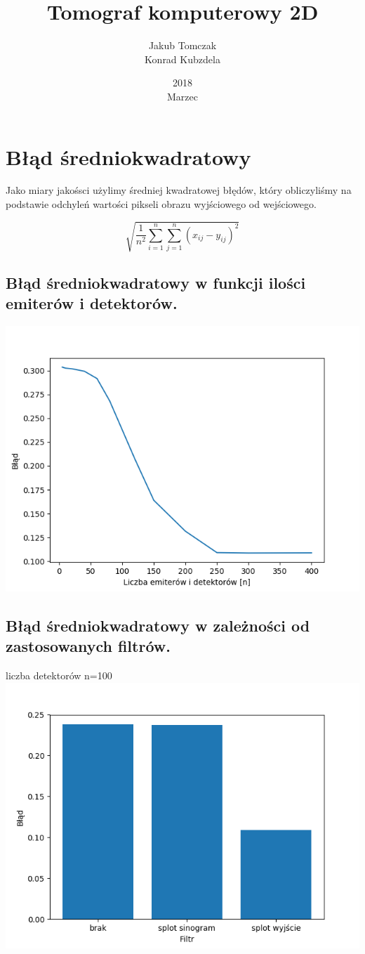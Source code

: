 \documentclass{article}
\title{Tomograf komputerowy 2D}
\date{2018\\ Marzec}
\author{Jakub Tomczak \\ Konrad Kubzdela}
\begin{document}
\maketitle

\section{Błąd średniokwadratowy}
Jako miary jakośsci użylimy średniej kwadratowej błędów, który obliczyliśmy na podstawie odchyleń wartości pikseli obrazu wyjściowego od wejściowego.

$$\sqrt{\frac{1}{n^2} \sum\limits_{i=1}^n\sum\limits_{j=1}^n (x_{ij}-y_{ij})^2}$$ 
\subsection
 {Błąd średniokwadratowy w funkcji ilości emiterów i detektorów.}
\includegraphics[width=\textwidth]{wykres}
\centering
\subsection{Błąd średniokwadratowy w zależności od zastosowanych filtrów.}
liczba detektorów n=100
\includegraphics[width=\textwidth]{wykres2}
\end{document}
